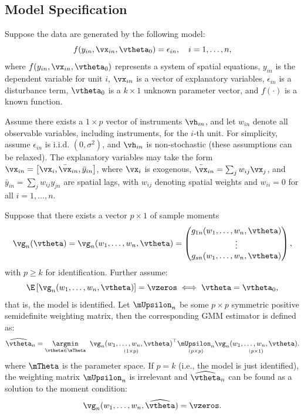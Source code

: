 \documentclass[english,12pt]{book}\usepackage[]{graphicx}\usepackage[]{xcolor}
\begin{document}
\subsection{Model Specification}

Suppose the data are generated by the following model:
\begin{equation*}
f(y_{in}, \vx_{in}, \vtheta_0) = \epsilon_{in}, \quad i = 1, \ldots, n,
\end{equation*}
%
where $f(y_{in}, \vx_{in}, \vtheta_0)$ represents a system of spatial equations, $y_{in}$ is the dependent variable for unit $i$, $\vx_{in}$ is a vector of explanatory variables, $\epsilon_{in}$ is a disturbance term, $\vtheta_0$ is a $k \times 1$ unknown parameter vector, and $f(\cdot)$ is a known function.

Assume there exists a $1 \times p$ vector of instruments $\vh_{in}$, and let $w_{in}$ denote all observable variables, including instruments, for the $i$-th unit. For simplicity, assume $\epsilon_{in}$ is i.i.d. $(0, \sigma^2)$, and $\vh_{in}$ is non-stochastic (these assumptions can be relaxed). The explanatory variables may take the form $\vx_{in} = \left[ \vx_i, \bar{\vx}_{in}, \bar{y}_{in} \right]$, where $\vx_i$ is exogenous, $\bar{\vx}_{in} = \sum_j w_{ij} \vx_j$, and  $\bar{y}_{in} = \sum_j w_{ij} y_{jn}$ are spatial lags, with $w_{ij}$ denoting spatial weights and $w_{ii} = 0$ for all $i = 1, \ldots, n$.


Suppose that there exists a vector $p \times 1$ of sample moments
\begin{equation}\label{eq:sample_moments_gmm}
\vg_n(\vtheta) = \vg_n(w_1, \ldots ,w_n, \vtheta) 
= \begin{pmatrix}
g_{1n}(w_1,\ldots,w_n, \vtheta) \\
\vdots \\
g_{sn}(w_1,\ldots,w_n, \vtheta)
\end{pmatrix},
\end{equation}
%
with $p \geq k$ for identification. Further assume:
\begin{equation*}
\E\left[\vg_n(w_1,\ldots ,w_n, \vtheta)\right] = \vzeros \iff \vtheta = \vtheta_0,
\end{equation*}
%
that is, the model is identified. Let $\mUpsilon_n$ be some $p \times p$ symmetric positive semidefinite weighting matrix, then the corresponding GMM estimator is defined as:
\begin{equation}\label{eq:gmm_one_step}
\widehat{\vtheta}_n = \underset{\vtheta \in \mTheta}{\argmin}\;\;\underset{(1\times p)}{\vg_n(w_1,\ldots,w_n, \vtheta)}^\top\underset{(p\times p)}{\mUpsilon_n}\underset{(p\times 1)}{\vg_n(w_1,\ldots,w_n, \vtheta)}.
\end{equation}
%
where $\mTheta$ is the parameter space. If $p = k$ (i.e., the model is just identified),  the weighting matrix $\mUpsilon_n$ is irrelevant and $\widehat{\vtheta}_n$ can be found as a solution to the moment condition:
\begin{equation}
\vg_n(w_1,\ldots,w_n, \widehat{\vtheta}) = \vzeros.
\end{equation}
\end{document}

